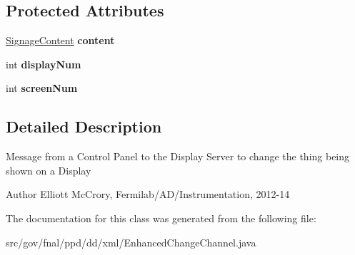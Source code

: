 \subsection*{Protected Attributes}
\begin{DoxyCompactItemize}
\item 
\hypertarget{classgov_1_1fnal_1_1ppd_1_1dd_1_1xml_1_1EnhancedChangeChannel_a415eff48b0f5f15dd8cfe6bc7b7120ad}{\hyperlink{interfacegov_1_1fnal_1_1ppd_1_1dd_1_1signage_1_1SignageContent}{Signage\-Content} {\bfseries content}}\label{classgov_1_1fnal_1_1ppd_1_1dd_1_1xml_1_1EnhancedChangeChannel_a415eff48b0f5f15dd8cfe6bc7b7120ad}

\item 
\hypertarget{classgov_1_1fnal_1_1ppd_1_1dd_1_1xml_1_1EnhancedChangeChannel_a862e72603f8d55b4224b89455fbdd18b}{int {\bfseries display\-Num}}\label{classgov_1_1fnal_1_1ppd_1_1dd_1_1xml_1_1EnhancedChangeChannel_a862e72603f8d55b4224b89455fbdd18b}

\item 
\hypertarget{classgov_1_1fnal_1_1ppd_1_1dd_1_1xml_1_1EnhancedChangeChannel_a1cf7b64756df3182248d13584d5f12e3}{int {\bfseries screen\-Num}}\label{classgov_1_1fnal_1_1ppd_1_1dd_1_1xml_1_1EnhancedChangeChannel_a1cf7b64756df3182248d13584d5f12e3}

\end{DoxyCompactItemize}


\subsection{Detailed Description}
Message from a Control Panel to the Display Server to change the thing being shown on a Display

\begin{DoxyAuthor}{Author}
Elliott Mc\-Crory, Fermilab/\-A\-D/\-Instrumentation, 2012-\/14 
\end{DoxyAuthor}


The documentation for this class was generated from the following file\-:\begin{DoxyCompactItemize}
\item 
src/gov/fnal/ppd/dd/xml/Enhanced\-Change\-Channel.\-java\end{DoxyCompactItemize}
